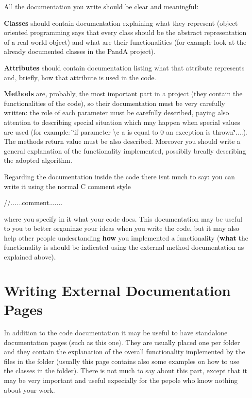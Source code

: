 All the documentation you write should be clear and meaningful\+:
\begin{DoxyItemize}
\item {\bfseries Classes} should contain documentation explaining what they represent (object oriented programming says that every class should be the abstract representation of a real world object) and what are their functionalities (for example look at the already documented classes in the PandA project).
\item {\bfseries Attributes} should contain documentation listing what that attribute represents and, briefly, how that attribute is used in the code.
\item {\bfseries Methods} are, probably, the most important part in a project (they contain the functionalities of the code), so their documentation must be very carefully written\+: the role of each parameter must be carefully described, paying also attention to describing special situation which may happen when special values are used (for example\+: \char`\"{}if parameter \textbackslash{}c a is equal to 0 an exception is thrown\char`\"{}....). The method\textquotesingle{}s return value must be also described. Moreover you should write a general explanation of the functionality implemented, possibily breafly describing the adopted algorithm.
\end{DoxyItemize}

Regarding the documentation inside the code there isn\textquotesingle{}t much to say\+: you can write it using the normal C comment style \begin{DoxyVerb}//......comment.......
\end{DoxyVerb}
 where you specify in it what your code does. This documentation may be useful to you to better organinze your ideas when you write the code, but it may also help other people undesrtanding {\bfseries how} you implemented a functionality ({\bfseries what} the functionality is should be indicated using the external method documentation as explained above).\hypertarget{documentation_how_to_ext_docs_how_to}{}\section{Writing External Documentation Pages}\label{documentation_how_to_ext_docs_how_to}
In addition to the code documentation it may be useful to have standalone documentation pages (such as this one). They are usually placed one per folder and they contain the explanation of the overall functionality implemented by the files in the folder (usually this page contains also some examples on how to use the classes in the folder). There is not much to say about this part, except that it may be very important and useful expecially for the pepole who know nothing about your work.


